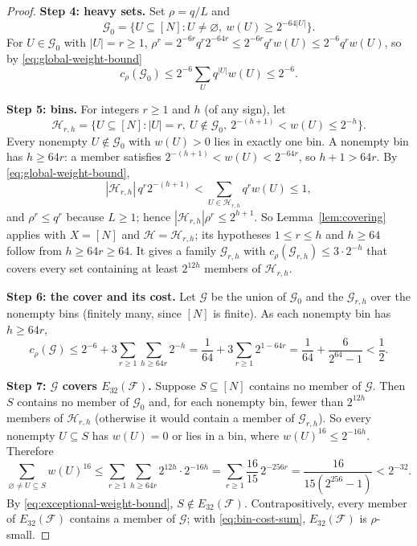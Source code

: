 \documentclass[11pt,letterpaper]{article}
\theoremstyle{definition}
\theoremstyle{remark}
\numberwithin{equation}{section}
\newcommand{\step}[1]{\par\smallskip\noindent\textbf{#1}\enspace}
\begin{document}
\begin{proof}
\step{Step 4: heavy sets.}
Set $\rho=q/L$ and
\[
 \mathcal G_0=
 \{U\subseteq[N]:U\ne\varnothing,\ w(U)\ge2^{-64|U|}\}.
\]
For $U\in\mathcal G_0$ with $|U|=r\ge1$,
$\rho^r=2^{-6r}q^r2^{-64r}\le2^{-6r}q^rw(U)\le2^{-6}q^rw(U)$, so by
\eqref{eq:global-weight-bound}
\begin{equation}\label{eq:outright-cost}
 c_\rho(\mathcal G_0)\le2^{-6}\sum_Uq^{|U|}w(U)\le2^{-6}.
\end{equation}

\step{Step 5: bins.}
For integers $r\ge1$ and $h$ (of any sign), let
\[
 \mathcal H_{r,h}=
 \bigl\{U\subseteq[N]:|U|=r,\ U\notin\mathcal G_0,
 \ 2^{-(h+1)}<w(U)\le2^{-h}\bigr\}.
\]
Every nonempty $U\notin\mathcal G_0$ with $w(U)>0$ lies in exactly one
bin. A nonempty bin has $h\ge64r$: a member satisfies
$2^{-(h+1)}<w(U)<2^{-64r}$, so $h+1>64r$. By
\eqref{eq:global-weight-bound},
\[
 |\mathcal H_{r,h}|\,q^r2^{-(h+1)}
 <\sum_{U\in\mathcal H_{r,h}}q^r w(U)\le1,
\]
and $\rho^r\le q^r$ because $L\ge1$; hence
$|\mathcal H_{r,h}|\rho^r\le2^{h+1}$. So Lemma~\ref{lem:covering} applies
with $X=[N]$ and $\mathcal H=\mathcal H_{r,h}$; its hypotheses
$1\le r\le h$ and $h\ge64$ follow from $h\ge64r\ge64$. It gives a family
$\mathcal G_{r,h}$ with $c_\rho(\mathcal G_{r,h})\le3\cdot2^{-h}$ that
covers every set containing at least $2^{12h}$ members of
$\mathcal H_{r,h}$.

\step{Step 6: the cover and its cost.}
Let $\mathcal G$ be the union of $\mathcal G_0$ and the
$\mathcal G_{r,h}$ over the nonempty bins (finitely many, since $[N]$ is
finite). As each nonempty bin has $h\ge64r$,
\begin{equation}\label{eq:bin-cost-sum}
 c_\rho(\mathcal G)
 \le2^{-6}+3\sum_{r\ge1}\sum_{h\ge64r}2^{-h}
 =\frac1{64}+3\sum_{r\ge1}2^{1-64r}
 =\frac1{64}+\frac{6}{2^{64}-1}<\frac12.
\end{equation}

\step{Step 7: $\mathcal G$ covers $E_{32}(\mathcal F)$.}
Suppose $S\subseteq[N]$ contains no member of $\mathcal G$. Then $S$
contains no member of $\mathcal G_0$ and, for each nonempty bin, fewer
than $2^{12h}$ members of $\mathcal H_{r,h}$ (otherwise it would contain
a member of $\mathcal G_{r,h}$). So every nonempty $U\subseteq S$ has
$w(U)=0$ or lies in a bin, where $w(U)^{16}\le2^{-16h}$. Therefore
\begin{equation}\label{eq:bin-power-sum}
 \sum_{\varnothing\ne U\subseteq S}w(U)^{16}
 \le\sum_{r\ge1}\sum_{h\ge64r}2^{12h}\cdot2^{-16h}
 =\sum_{r\ge1}\frac{16}{15}\,2^{-256r}
 =\frac{16}{15(2^{256}-1)}<2^{-32}.
\end{equation}
By \eqref{eq:exceptional-weight-bound}, $S\notin E_{32}(\mathcal F)$.
Contrapositively, every member of $E_{32}(\mathcal F)$ contains a member
of $\mathcal G$; with \eqref{eq:bin-cost-sum}, $E_{32}(\mathcal F)$ is
$\rho$-small.
\end{proof}
\end{document}
